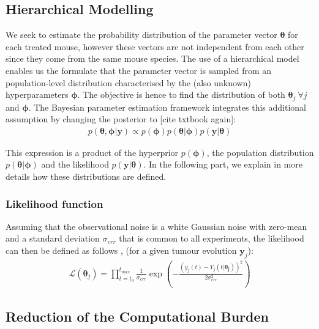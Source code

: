 \documentclass[11pt]{article}
\begin{document}
\subsection{Hierarchical Modelling}
We seek to estimate the probability distribution of the parameter vector $\boldsymbol{\theta}$ for each treated mouse, however these vectors are not independent from each other since they come from the same mouse species. The use of a hierarchical model enables us the formulate that the parameter vector is sampled from an population-level distribution characterised by the (also unknown) hyperparameters $\boldsymbol{\phi}$. The objective is hence to find the distribution of both $\boldsymbol{\theta}_j~\forall j$ and $\boldsymbol{\phi}$. The Bayesian parameter estimation framework integrates this additional assumption by changing the posterior to [cite txtbook again]:
\begin{align*}
    p(\boldsymbol{\theta}, \boldsymbol{\phi} | \boldsymbol{y}) \propto p(\boldsymbol{\phi})p(\boldsymbol{\theta}|\boldsymbol{\phi})p(\boldsymbol{y}|\boldsymbol{\theta})
\end{align*} 

This expression is a product of the hyperprior $p(\boldsymbol{\phi})$, the population distribution $p(\boldsymbol{\theta}|\boldsymbol{\phi})$ and the likelihood $p(\boldsymbol{y}|\boldsymbol{\theta})$. In the following part, we explain in more details how these distributions are defined.

\subsubsection{Likelihood function}
Assuming that the observational noise is a white Gaussian noise with zero-mean and a standard deviation $\sigma_{err}$ that is common to all experiments, the likelihood can then be defined as follows \cite{liu_wang}, \cite{likelihood_2} (for a given tumour evolution $\boldsymbol{y}_j$):
\begin{align*}
    \mathcal{L}(\boldsymbol{\theta}_j) = \prod_{t=t_0}^{t_{max}} \frac{1}{\sigma_{err}} \exp\left(-\frac{(y_{j}(t) - Y_j(t|\boldsymbol{\theta_j}))^2}{2\sigma_{err}^2}\right)  
\end{align*}
\subsection{Reduction of the Computational Burden}
\end{document}

